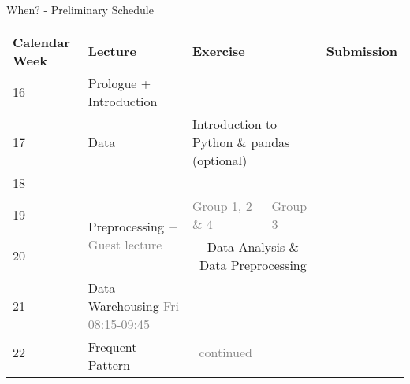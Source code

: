 \begin{frame}{When? - Preliminary Schedule}
	\footnotesize
	\centering
	\begin{tabular}{|p{4em}|p{15em}|p{9.5em}|p{9.5em}|p{10em}|}
		\hline
		\rowcolor{faugray!62}\textbf{Calendar Week} & \textbf{Lecture}                                                  & \multicolumn{2}{|l|}{\textbf{Exercise}}                                         & \textbf{Submission}                                                      \\ \hhline{*{5}{:=}:}
		\cellcolor{faugray!25}16                    & Prologue + Introduction                                           & \multicolumn{2}{|l|}{\cellcolor{gray!50}}                                       & \cellcolor{gray!50}                                                      \\ \hhline{|-|-|-|-|-|}
		\cellcolor{faugray!25}17                    & Data                                                              & \multicolumn{2}{|l|}{Introduction to Python \& pandas {\color{gray}(optional)}} & \cellcolor{gray!50}                                                      \\ \hhline{|-|-|-|-|-|}
		\cellcolor{faugray!25}18                    & \multicolumn{4}{|l|}{\cellcolor{gray!50}}                                                                                                                                                                                      \\ \hhline{|-|-|-|-|-|}
		\cellcolor{faugray!25}19                    & \multirow{2}{*}{Preprocessing \textcolor{gray}{ + Guest lecture}} & \centering\tiny\textcolor{gray}{Group 1, 2 \& 4}                                & \centering\tiny\textcolor{gray}{Group 3}           & \cellcolor{gray!50} \\ \hhline{|-|~|~~|-|}
		\cellcolor{faugray!25}20                    &                                                                   & \multicolumn{2}{|c|}{Data Analysis \& Data Preprocessing}                       & \cellcolor{gray!50}                                                      \\ \hhline{|--|~|~|-|}
		\cellcolor{faugray!25}21                    & Data Warehousing \textcolor{gray}{\tiny Fri 08:15-09:45}          & \cellcolor{gray!50}                                                             &                                                    & \cellcolor{gray!50} \\ \hhline{|-|-|-|-|-|}
		\cellcolor{faugray!25}22                    & \multirow{2}{*}{Frequent Pattern}                                 & \multicolumn{1}{|c|}{\textcolor{gray}{\tiny continued}}                         & \cellcolor{gray!50}                                & \cellcolor{gray!50} \\ \hhline{|-|~|-|-|-|}

\end{tabular}
\end{frame}
